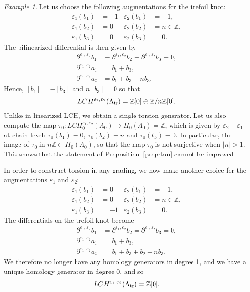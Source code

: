 \documentclass[11pt]{amsart}
\theoremstyle{plain}
\theoremstyle{remark}
\newtheorem{Ex}[defn]{Example}
\numberwithin{equation}{section}
\newcommand{\Z}{\ensuremath{\mathbb{Z}}}
\begin{document}
\begin{Ex}  \label{ex:tau0-bilin}
Let us choose the following augmentations for the trefoil knot:
\begin{align*}
\varepsilon_1(b_1)&=-1 & \varepsilon_2(b_1)&=-1,\\
\varepsilon_1(b_2)&=0 & \varepsilon_2(b_2)&=n\in\Z,\\
\varepsilon_1(b_3)&=0 & \varepsilon_2(b_3)&=0.
\end{align*}
The bilinearized differential is then given by
\begin{align*}
\partial^{\varepsilon_1,\varepsilon_2} b_1 &= \partial^{\varepsilon_1,\varepsilon_2} b_2 = \partial^{\varepsilon_1,\varepsilon_2} b_3 = 0, \\
\partial^{\varepsilon_1,\varepsilon_2} a_1 &= b_1 + b_3,\\
 \partial^{\varepsilon_1,\varepsilon_2} a_2 &=b_1 + b_3 -nb_3.
 \end{align*}
Hence, $[b_1] = -[b_3]$ and $n[b_3]=0$ so that
$$
LCH^{\varepsilon_1, \varepsilon_2}(\Lambda_{\rm tr}) = \Z[0] \oplus \Z/n\Z[0].
$$
Unlike in linearized LCH, we obtain a single torsion generator. Let us also compute the map 
$\tau_0: LCH^{\varepsilon_1, \varepsilon_2}_0(\Lambda_0) \to H_0(\Lambda_0) = \Z$, 
which is given by $\varepsilon_2 - \varepsilon_1$ at chain level: $\tau_0(b_1) = 0$, $\tau_0(b_2) = n$ and $\tau_0(b_3) = 0$. In particular,
the image of $\tau_0$ in $n\Z \subset H_0(\Lambda_0)$, so that the map $\tau_0$ is not surjective when $|n| > 1$. 
This shows that the statement of Proposition~\ref{prop:tau} cannot be improved.
\end{Ex}

In order to construct torsion in any grading, we now make another choice for the augmentations $\varepsilon_1$ and $\varepsilon_2$:
\begin{align*}
\varepsilon_1(b_1)&=0 & \varepsilon_2(b_1)&=-1,\\
\varepsilon_1(b_2)&=0 & \varepsilon_2(b_2)&=n\in\Z,\\
\varepsilon_1(b_3)&=-1 & \varepsilon_2(b_3)&=0.
\end{align*}
The differentials on the trefoil knot become 
\begin{align*}
\partial^{\varepsilon_1,\varepsilon_2} b_1 &= \partial^{\varepsilon_1,\varepsilon_2} b_2 = \partial^{\varepsilon_1,\varepsilon_2} b_3 = 0, \\
\partial^{\varepsilon_1,\varepsilon_2} a_1 &= b_1 + b_3,\\
 \partial^{\varepsilon_1,\varepsilon_2} a_2 &=b_1 + b_3 + b_2 -nb_3.\end{align*}
 We therefore no longer have any homology generators in degree 1, and we have a unique homology generator in degree 0, and so
 $$
 LCH^{\varepsilon_1, \varepsilon_2}(\Lambda_{\rm tr}) = \Z[0].
 $$
 
\end{document}
